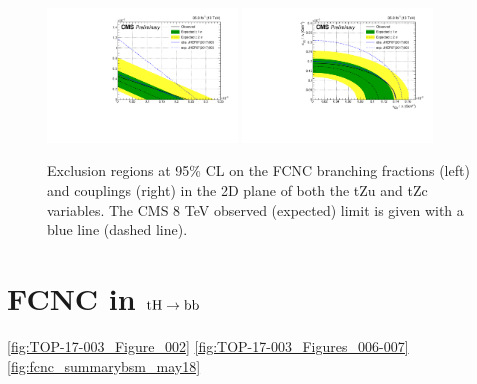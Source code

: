 \documentclass{PoS}
\begin{document}
\begin{figure}[htb]
\centering
\includegraphics[width=0.45\textwidth]{figures/CMS-PAS-TOP-17-017_Figure_007-a}
\includegraphics[width=0.45\textwidth]{figures/CMS-PAS-TOP-17-017_Figure_007-b}
\caption{
  Exclusion regions at 95\% CL on the FCNC branching fractions (left) and
  couplings (right) in the 2D plane of both the tZu and tZc variables. The CMS
  8 TeV observed (expected) limit is given with a blue line (dashed line).
}
\label{fig:TOP-17-017_Figure_007}
\end{figure}


\section{FCNC in ${\rm tH \to bb}$}

\cite{top-17-003}
\ref{fig:TOP-17-003_Figure_002}
\ref{fig:TOP-17-003_Figures_006-007}
\ref{fig:fcnc_summarybsm_may18}
\end{document}
